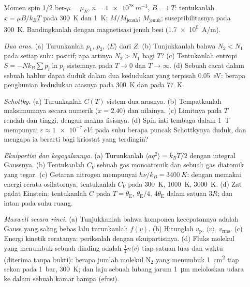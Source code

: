 \begin{exercise}[$\star$]\label{exo:b2:boltzmann-factor:4}
Momen spin 1/2 ber-$\mu = \mu_B$, $n = \qty{1e28}{m^{-3}}$, $B = \qty{1}{T}$:
tentukanlah $x = \mu B/k_BT$ pada \qty{300}{K} dan \qty{1}{K}; $M/M_{\text{jenuh}}$; $M_{\text{jenuh}}$;
suseptibilitasnya pada \qty{300}{K}. Bandingkanlah dengan magnetisasi jenuh
besi (\qty{1.7e6}{A/m}).
\end{exercise}

\begin{exercise}[$\star\star$]\label{exo:b2:boltzmann-factor:5}
\emph{Dua aras.} (a) Turunkanlah $p_1$, $p_2$, $\langle E\rangle$ dari $Z$. (b)
Tunjukkanlah bahwa $N_2 < N_1$ pada setiap suhu positif; apa artinya $N_2 >
N_1$ bagi $T$? (c) Tentukanlah entropi $S = -Nk_B\sum p_i\ln p_i$ sistemnya pada
$T \to 0$ dan $T \to \infty$. (d) Sebuah cacat dalam sebuah hablur dapat duduk dalam dua
kedudukan yang terpisah \qty{0.05}{eV}: berapa penghunian kedudukan atasnya pada
\qty{300}{K} dan pada \qty{77}{K}.
\end{exercise}

\begin{exercise}[$\star\star$]\label{exo:b2:boltzmann-factor:6}
\emph{Schottky.} (a) Turunkanlah $C(T)$ sistem dua arasnya. (b) Tempatkanlah
maksimumnya secara numerik ($x = 2.40$) dan nilainya. (c) Limitnya pada $T$ rendah
dan tinggi, dengan makna fisisnya. (d) Spin inti tembaga
dalam \qty{1}{T} mempunyai $\varepsilon \approx \qty{1e-7}{eV}$: pada suhu berapa
puncak Schottkynya duduk, dan mengapa ia berarti bagi kriostat
yang terdingin?
\end{exercise}

\begin{exercise}[$\star\star$]\label{exo:b2:boltzmann-factor:7}
\emph{Ekuipartisi dan kegagalannya.} (a) Turunkanlah $\langle aq^2\rangle =
k_BT/2$ dengan integral Gaussnya. (b) Tentukanlah $C_V$ sebuah gas monoatomik dan sebuah
gas diatomik yang tegar. (c) Getaran nitrogen mempunyai $h\nu/k_B = \qty{3400}{K}$:
dengan memakai energi rerata osilatornya, tentukanlah $C_V$ pada \qty{300}{K}, \qty{1000}{K},
\qty{3000}{K}. (d) Zat padat Einstein: tentukanlah $C$ pada $T = \theta_{\text{E}}$, $\theta_{\text{E}}/4$,
$4\theta_{\text{E}}$ dalam satuan $3R$; dan intan pada suhu ruang.
\end{exercise}

\begin{exercise}[$\star\star$]\label{exo:b2:boltzmann-factor:8}
\emph{Maxwell secara rinci.} (a) Tunjukkanlah bahwa komponen kecepatannya adalah
Gauss yang saling bebas lalu turunkanlah $f(v)$. (b) Hitunglah $v_{\text{p}}$,
$\langle v\rangle$, $v_{\text{rms}}$. (c) Energi kinetik reratanya: periksalah dengan
ekuipartisinya. (d) Fluks molekul yang menumbuk sebuah dinding adalah
$\tfrac14n\langle v\rangle$ tiap satuan luas dan waktu (diterima tanpa bukti): berapa jumlah
molekul N$_2$ yang menumbuk \qty{1}{cm^2} tiap sekon pada \qty{1}{bar},
\qty{300}{K}; dan laju sebuah lubang jarum \qty{1}{\micro m} meloloskan udara
ke dalam sebuah kamar hampa (efusi).
\end{exercise}

